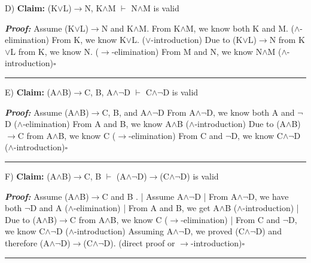 \documentclass{article}
\begin{document}
D) \textbf{Claim: } (K$\lor$L)$\rightarrow$N, K$\wedge$M $\vdash$ N$\wedge$M is valid\newline

\textbf{\textit{Proof: }}\newline
Assume (K$\lor$L)$\rightarrow$N and K$\wedge$M. \newline
From K$\wedge$M, we know both K and M. ($\wedge$-elimination)\newline
From K, we know K$\lor$L. ($\lor$-introduction)\newline
Due to (K$\lor$L)$\rightarrow$N from K$\lor$L from K, we know N. ($\rightarrow$-elimination)\newline
From M and N, we know N$\wedge$M ($\wedge$-introduction)$\square$\newline\rule{10cm}{1pt}\newline



E) \textbf{Claim: } (A$\wedge$B)$\rightarrow$C, B, A$\wedge$$\neg$D $\vdash$ C$\wedge$$\neg$D is valid\newline

\textbf{\textit{Proof: }}\newline
Assume (A$\wedge$B)$\rightarrow$C, B, and A$\wedge$$\neg$D\newline
From A$\wedge$$\neg$D, we know both A and $\neg$D ($\wedge$-elimination)\newline
From A and B, we know A$\wedge$B ($\wedge$-introduction)\newline
Due to (A$\wedge$B)$\rightarrow$C from A$\wedge$B, we know C ($\rightarrow$-elimination)\newline
From C and $\neg$D, we know C$\wedge$$\neg$D ($\wedge$-introduction)$\square$\newline\rule{10cm}{1pt}\newline



F) \textbf{Claim: } (A$\wedge$B)$\rightarrow$C, B $\vdash$ (A$\wedge$$\neg$D)$\rightarrow$(C$\wedge$$\neg$D) is valid\newline

\textbf{\textit{Proof: }}\newline
Assume (A$\wedge$B)$\rightarrow$C and B . \newline
|	Assume A$\wedge$$\neg$D\newline
|	From A$\wedge$$\neg$D, we have both $\neg$D and A ($\wedge$-elimination)\newline
|	From A and B, we get A$\wedge$B ($\wedge$-introduction)\newline
|	Due to (A$\wedge$B)$\rightarrow$C from A$\wedge$B, we know C ($\rightarrow$-elimination)\newline
|	From C and $\neg$D, we know C$\wedge$$\neg$D ($\wedge$-introduction)\newline
Assuming A$\wedge$$\neg$D, we proved (C$\wedge$$\neg$D) and therefore (A$\wedge$$\neg$D)$\rightarrow$(C$\wedge$$\neg$D). (direct proof or $\rightarrow$-introduction)$\square$\newline\rule{10cm}{1pt}\newline
\end{document}
